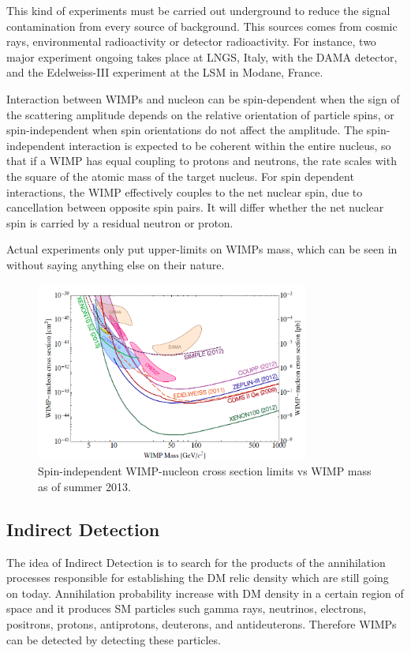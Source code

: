 This kind of experiments must be carried out underground to reduce the signal contamination from every source of background. This sources comes from cosmic rays, environmental radioactivity or detector radioactivity. For instance, two major experiment ongoing takes place at LNGS, Italy, with the DAMA detector, and the Edelweiss-III experiment at the LSM in Modane, France.

Interaction between WIMPs and nucleon can be spin-dependent when the sign of the scattering amplitude depends on the relative orientation of particle spins, or spin-independent when spin orientations do not affect the amplitude. The spin-independent interaction is expected to be coherent within the entire nucleus, so that if a WIMP has equal coupling to protons and neutrons, the rate scales with the square of the atomic mass of the target nucleus. For spin dependent interactions, the WIMP effectively couples to the net nuclear spin, due to cancellation between opposite spin pairs. It will differ  whether the net nuclear spin is carried by a residual neutron or proton. 

Actual experiments only put upper-limits on WIMPs mass, which can be seen in \Fig{\ref{fig:WIMPcs}} without saying anything else on their nature.

\begin{figure}[pt]
\centering
\includegraphics[width=0.8\textwidth]{DarkMatter/WIMPcs}
\caption{Spin-independent WIMP-nucleon cross section limits vs WIMP mass as of summer 2013.}
\label{fig:WIMPcs}
\end{figure}

\subsection{Indirect Detection}
The idea of Indirect Detection is to search for the products of the annihilation processes responsible for establishing the DM relic density which are still going on today. Annihilation probability increase with DM density in a certain region of space and it produces SM particles such gamma rays, neutrinos, electrons, positrons, protons, antiprotons, deuterons, and antideuterons. Therefore WIMPs can be detected by detecting these particles.

